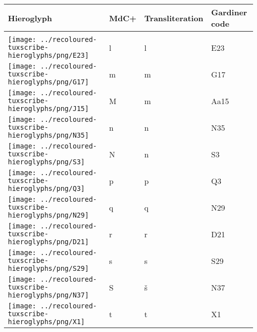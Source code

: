 \begin{center}
\begin{tabularx}{\linewidth}{YYYY}
Hieroglyph & MdC+ & Transliteration & Gardiner code\\
\hline\\
\vspace{0.30000cm} \texttt{[image: ../recoloured-tuxscribe-hieroglyphs/png/E23]} \vspace{0.30000cm} & l & l & E23 \\ 
\texttt{[image: ../recoloured-tuxscribe-hieroglyphs/png/G17]} & m & m & G17 \\ 
\vspace{0.32500cm} \texttt{[image: ../recoloured-tuxscribe-hieroglyphs/png/J15]} \vspace{0.32500cm} & M & m & Aa15 \\ 
\vspace{0.50000cm} \texttt{[image: ../recoloured-tuxscribe-hieroglyphs/png/N35]} \vspace{0.50000cm} & n & n & N35 \\ 
\texttt{[image: ../recoloured-tuxscribe-hieroglyphs/png/S3]} & N & n & S3 \\ 
\texttt{[image: ../recoloured-tuxscribe-hieroglyphs/png/Q3]} & p & p & Q3 \\ 
\texttt{[image: ../recoloured-tuxscribe-hieroglyphs/png/N29]} & q & q & N29 \\ 
\vspace{0.30000cm} \texttt{[image: ../recoloured-tuxscribe-hieroglyphs/png/D21]} \vspace{0.30000cm} & r & r & D21 \\ 
\texttt{[image: ../recoloured-tuxscribe-hieroglyphs/png/S29]} & s & s & S29 \\ 
\texttt{[image: ../recoloured-tuxscribe-hieroglyphs/png/N37]} & S & š & N37 \\ 
\vspace{0.25000cm} \texttt{[image: ../recoloured-tuxscribe-hieroglyphs/png/X1]} \vspace{0.25000cm} & t & t & X1 \\ 

\end{tabularx}
\end{center}

